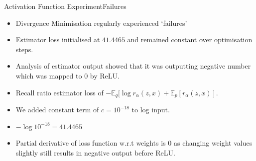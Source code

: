 \documentclass{beamer}
\newcommand{\E}{\mathbb{E}}
\begin{document}
\begin{frame}{Activation Function Experiment}{Failures}
\begin{itemize}
\item Divergence Minimisation regularly experienced `failures'
\item Estimator loss initialised at $41.4465$ and remained constant over optimisation steps.
\item Analysis of estimator output showed that it was outputting negative number which was mapped to $0$ by ReLU.
\item Recall ratio estimator loss of $-\E_q[\log r_\alpha(z,x)+\E_p[r_\alpha(z,x)]$.
\item We added constant term of $c=10^{-18}$ to log input.
\item $-\log 10^{-18}=41.4465$
\item Partial derivative of loss function w.r.t weights is $0$ as changing weight values slightly still results in negative output before ReLU.
\end{itemize}
\end{frame}
\end{document}
